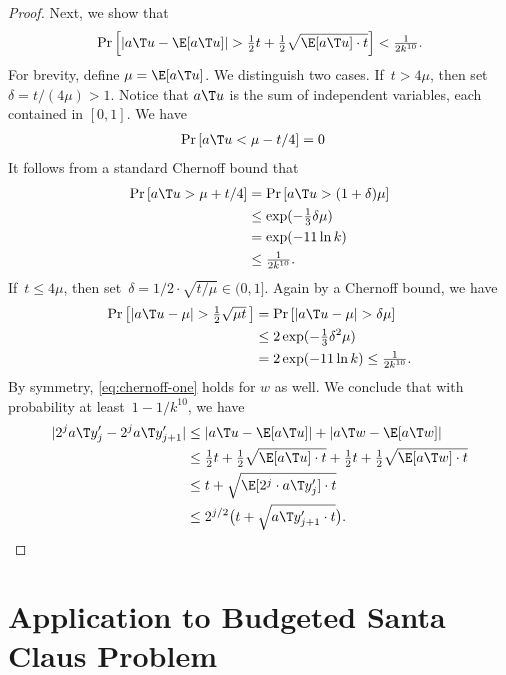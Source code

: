 \documentclass[a4paper,USenglish,cleveref,thm-restate]{lipics-v2021}
\begin{document}
\begin{proof}
    Next, we show that
    \begin{equation}\label{eq:chernoff-one}
        \Pr \left[ | a\T u - \E[a\T u] | > \tfrac{1}{2} t + \tfrac{1}{2} \sqrt{\E[a\T u]  \cdot t} \right] < \tfrac{1}{2 k^{10}}.
    \end{equation}
    For brevity, define $\mu = \E[a\T u]$.
    We distinguish two cases. If~$t > 4\mu$, then set~$\delta = t / (4\mu) > 1$.
    Notice that $a\T u$ is the sum of independent variables, each contained in $[0,1]$.
    We have
    \begin{align*}
        \Pr \left[ a\T u < \mu - t/4 \right] &= 0
    \end{align*}
    It follows from a standard Chernoff bound that
    \begin{align*}
        \Pr \left[ a\T u  > \mu + t/4 \right] 
        &= \Pr \left[ a\T u > (1 + \delta) \mu \right] \\
        &\le \exp(-\tfrac{1}{3} \delta \mu) \\
        &= \exp(- 11 \ln k) \\
        &\le \tfrac{1}{2 k^{10}}.
    \end{align*}
    If~$t \le 4\mu$, then set~$\delta= 1/2 \cdot \sqrt{t/\mu} \in (0,1]$. Again by a Chernoff bound, we have
    \begin{align*}
        \Pr \left[ |a\T u  - \mu| > \tfrac{1}{2}\sqrt{\mu t} \,\right]
        &= \Pr \left[ |a\T u - \mu| > \delta \mu \right] \\
        &\le 2 \exp(- \tfrac{1}{3} \delta^2 \mu) \\
        &= 2 \exp(- 11 \ln k) \le \tfrac{1}{2 k^{10}} .
    \end{align*}
    By symmetry, \cref{eq:chernoff-one} holds for $w$ as well. 
    We conclude that with probability at least~$1 - 1/k^{10}$, we have
    \begin{align*}
        | 2^j a\T y'_j - 2^j a\T y'_{j+1} | 
        &\le | a\T u - \E[a\T u] | + | a\T w - \E[a\T w] | \\ 
        &\le \tfrac{1}{2} t + \tfrac{1}{2} \sqrt{\E[a\T u]  \cdot t} + \tfrac{1}{2} t + \tfrac{1}{2} \sqrt{\E[a\T w] \cdot t} \\
        &\le t + \sqrt{\E[2^j \cdot a\T y'_j] \cdot t} \\
        &\le 2^{j/2} \big(t + \sqrt{a\T y'_{j+1} \cdot t}\big). \qedhere
    \end{align*}
\end{proof} \section{Application to Budgeted Santa Claus Problem}
\label{sec:santa-claus}
\end{document}
